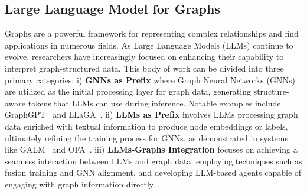 \documentclass{article} %
\begin{document}
\vspace{-0.1in}
\subsection{Large Language Model for Graphs}\vspace{-0.05in}
Graphs are a powerful framework for representing complex relationships and find applications in numerous fields. As Large Language Models (LLMs) continue to evolve, researchers have increasingly focused on enhancing their capability to interpret graph-structured data. This body of work can be divided into three primary categories: i) \textbf{GNNs as Prefix} where Graph Neural Networks (GNNs) are utilized as the initial processing layer for graph data, generating structure-aware tokens that LLMs can use during inference. Notable examples include GraphGPT~\cite{tang2024graphgpt} and LLaGA~\cite{chenllaga}. ii) \textbf{LLMs as Prefix} involves LLMs processing graph data enriched with textual information to produce node embeddings or labels, ultimately refining the training process for GNNs, as demonstrated in systems like GALM~\cite{xie2023graph} and OFA~\cite{liuone}. iii) \textbf{LLMs-Graphs Integration} focuses on achieving a seamless interaction between LLMs and graph data, employing techniques such as fusion training and GNN alignment, and developing LLM-based agents capable of engaging with graph information directly~\cite{li2023grenade,brannon2023congrat}.
\end{document}
